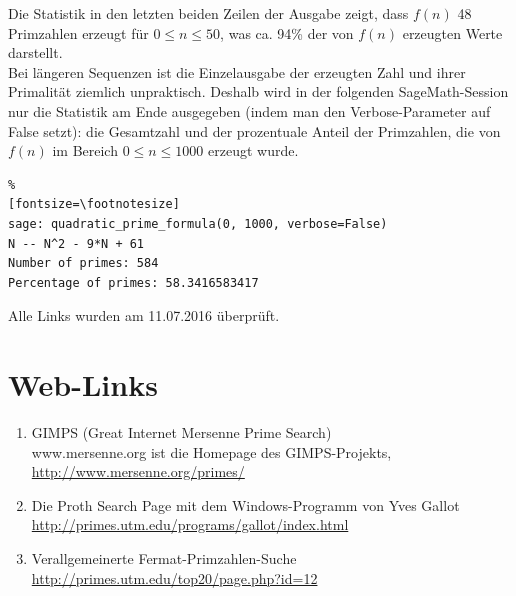 \begin{refsegment}
\noindent Die Statistik in den letzten beiden Zeilen der Ausgabe zeigt, dass
$f(n)$ 48 Primzahlen erzeugt für $0 \leq n \leq 50$, was ca. 94\% der von
$f(n)$ erzeugten Werte darstellt.\\

Bei längeren Sequenzen ist die Einzelausgabe der erzeugten Zahl und ihrer Primalität
ziemlich unpraktisch. Deshalb wird in der folgenden SageMath-Session nur die Statistik am
Ende ausgegeben (indem man den Verbose-Parameter auf False setzt): die Gesamtzahl und
der prozentuale Anteil der Primzahlen, die von
$f(n)$ im Bereich $0 \leq n \leq 1000$ erzeugt wurde.

\begin{Verbatim}%
[fontsize=\footnotesize]
sage: quadratic_prime_formula(0, 1000, verbose=False)
N -- N^2 - 9*N + 61
Number of primes: 584
Percentage of primes: 58.3416583417
\end{Verbatim}






\printbibliography[%
	heading=subbibintoc,
	title={Literatur zu Kapitel \thechapter},
	segment=\therefsegment,
]

\noindent Alle Links wurden am 11.07.2016 überprüft.


\newpage
\chapter*{Web-Links}

\begin{enumerate}
   \item GIMPS (Great Internet Mersenne Prime Search)
       \\
         www.mersenne.org ist die Homepage des GIMPS-Projekts,  \\
      \url{http://www.mersenne.org/primes/}

\item Die Proth Search Page mit dem Windows-Programm von Yves Gallot \\
      \url{http://primes.utm.edu/programs/gallot/index.html}

\item Verallgemeinerte Fermat-Primzahlen-Suche \\
      \url{http://primes.utm.edu/top20/page.php?id=12}


\end{enumerate}
\end{refsegment}
